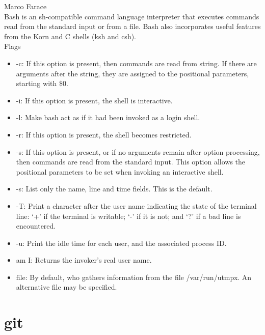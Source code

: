 \documentclass[hidelinks,12pt,a4paper,numbers=enddot]{scrartcl}
\begin{document}
\large Marco Farace \normalsize\\



Bash is an sh-compatible command language interpreter that executes commands
read from the standard input or from a file. Bash also incorporates useful
features from the Korn and C shells (ksh and csh).\\

Flags
\begin{itemize}
    \item -c: If this option is present, then commands are read from
        string.  If there are arguments after the string, they are
        assigned to the positional parameters, starting with \$0.
    
    \item -i: If this option is present, the shell is interactive.
    \item -l: Make bash act as if it had been invoked as a login shell.
    \item -r: If this option is present, the shell becomes restricted.
    \item -s: If this option is present, or if no arguments remain after
        option processing, then commands are read from  the  standard
        input.   This  option  allows the positional parameters to be
        set when invoking an interactive shell.
    
    \item -s: List only the name, line and time fields.  This is the default.
    \item -T: Print a character after the user name indicating the state of the
        terminal line: `+' if the terminal is writable; `-' if it is not;
        and `?' if a bad line is encountered.
    
    \item -u: Print the idle time for each user, and the associated process ID.
    \item am I: Returns the invoker's real user name.
    \item file: By default, who gathers information from the file /var/run/utmpx.
        An alternative file may be specified.
    
\end{itemize}

\section{git}
\end{document}
